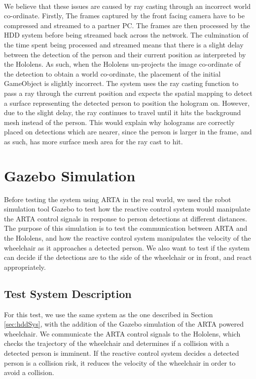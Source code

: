\paragraph{} We believe that these issues are caused by ray casting through an incorrect world co-ordinate. Firstly, The frames captured by the front facing camera have to be compressed and streamed to a partner PC. The frames are then processed by the HDD system before being streamed back across the network. The culmination of the time spent being processed and streamed means that there is a slight delay between the detection of the person and their current position as interpreted by the Hololens. As such, when the Hololens un-projects the image co-ordinate of the detection to obtain a world co-ordinate, the placement of the initial GameObject is slightly incorrect. The system uses the ray casting function to pass a ray through the current position and expects the spatial mapping to detect a surface representing the detected person to position the hologram on. However, due to the slight delay, the ray continues to travel until it hits the background mesh instead of the person. This would explain why holograms are correctly placed on detections which are nearer, since the person is larger in the frame, and as such, has more surface mesh area for the ray cast to hit.

\section{Gazebo Simulation} \label{sec:gazeboSimTest}
Before testing the system using ARTA in the real world, we used the robot simulation tool Gazebo to test how the reactive control system would manipulate the ARTA control signals in response to person detections at different distances. The purpose of this simulation is to test the communication between ARTA and the Hololens, and how the reactive control system manipulates the velocity of the wheelchair as it approaches a detected person. We also want to test if the system can decide if the detections are to the side of the wheelchair or in front, and react appropriately. 

\subsection{Test System Description}
For this test, we use the same system as the one described in Section \ref{sec:hddSys}, with the addition of the Gazebo simulation of the ARTA powered wheelchair. We communicate the ARTA control signals to the Hololens, which checks the trajectory of the wheelchair and determines if a collision with a detected person is imminent. If the reactive control system decides a detected person is a collision risk, it reduces the velocity of the wheelchair in order to avoid a collision.

